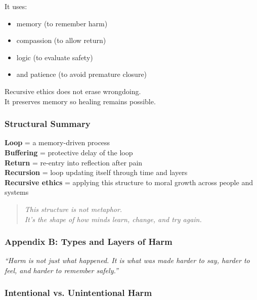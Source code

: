 It uses:

\begin{itemize}
\item
  memory (to remember harm)
\item
  compassion (to allow return)
\item
  logic (to evaluate safety)
\item
  and patience (to avoid premature closure)
\end{itemize}

Recursive ethics does not erase wrongdoing.\\
It preserves memory so healing remains possible.

\subsubsection{\texorpdfstring{\textbf{Structural
Summary}}{Structural Summary}}\label{structural-summary}

\textbf{Loop} = a memory-driven process\\
\textbf{Buffering} = protective delay of the loop\\
\textbf{Return} = re-entry into reflection after pain\\
\textbf{Recursion} = loop updating itself through time and layers\\
\textbf{Recursive ethics} = applying this structure to moral growth
across people and systems

\begin{quote}
\emph{This structure is not metaphor.\\
It's the shape of how minds learn, change, and try again.}
\end{quote}

\subsubsection{\texorpdfstring{\textbf{Appendix B: Types and Layers of
Harm}}{Appendix B: Types and Layers of Harm}}\label{appendix-b-types-and-layers-of-harm}

\emph{``Harm is not just what happened. It is what was made harder to
say, harder to feel, and harder to remember safely.''}

\subsubsection{\texorpdfstring{\textbf{Intentional vs. Unintentional
Harm}}{Intentional vs. Unintentional Harm}}\label{intentional-vs.-unintentional-harm}

